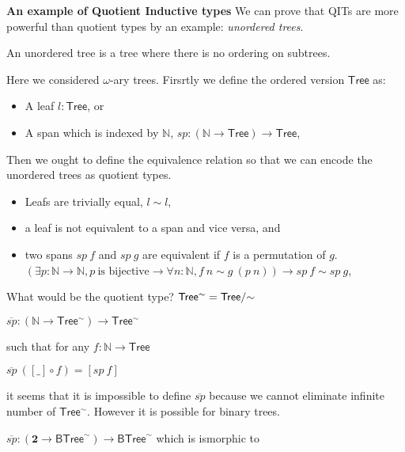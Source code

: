 \textbf{An example of Quotient Inductive types}
We can prove that QITs are more powerful than quotient types by an
example: \emph{unordered trees}. 


\begin{definition}
An unordered tree is a tree where there is no ordering on subtrees.
\end{definition}

Here we considered $\omega$-ary trees. Firsrtly we define the ordered version $\mathsf{Tree}$ as:

\begin{itemize}
\item A leaf $l: \mathsf{Tree}$, or
\item A span which is indexed by $\mathbb{N}$, $sp : (\mathbb{N} \rightarrow \mathsf{Tree}) \rightarrow \mathsf{Tree}$,
\end{itemize}

Then we ought to define the equivalence relation so that we can encode
the unordered trees as quotient types.

\begin{itemize}
\item Leafs are trivially equal, $l \sim l$,
\item a leaf is not equivalent to a span and vice versa, and
\item two spans $sp~f$ and $sp~g$ are equivalent if $f$ is a
  permutation of $g$.
 $(\exists p: \mathbb{N} \rightarrow \mathbb{N}, p~\text{is bijective} \rightarrow
\forall n: \mathbb{N},  f~n \sim g~(p~n)) \rightarrow sp~f \sim sp~g$,
\end{itemize}

What would be the quotient type? $ \mathsf{Tree^{\sim}} =
\qset{\mathsf{Tree}}$ 

$\overline{sp} : (\mathbb{N} \rightarrow \mathsf{Tree^{\sim}}) \rightarrow \mathsf{Tree^{\sim}}$

such that for any $f : \mathbb{N} \rightarrow \mathsf{Tree}$

$\overline{sp}~ ([\_] \circ f) = [ sp~f ] $

it seems that it is impossible to define $\overline{sp}$ because we
cannot eliminate infinite number of $\mathsf{Tree^{\sim}}$.
However it is possible for binary trees.

$\overline{sp} : (\textbf{2} \rightarrow \mathsf{BTree}^{\sim}) \rightarrow
\mathsf{BTree}^{\sim}$ which is ismorphic to


